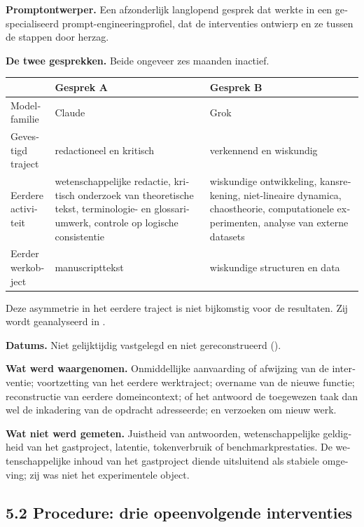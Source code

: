 \begin{dutch}
\textbf{Promptontwerper.} Een afzonderlijk langlopend gesprek dat werkte in een gespecialiseerd prompt-engineeringprofiel, dat de interventies ontwierp en ze tussen de stappen door herzag.

\textbf{De twee gesprekken.} Beide ongeveer zes maanden inactief.

\begin{center}
\small
\begin{tabularx}{\linewidth}{>{\raggedright\arraybackslash}X>{\raggedright\arraybackslash}X>{\raggedright\arraybackslash}X}
\toprule
 & \textbf{Gesprek A} & \textbf{Gesprek B} \\
\midrule
Modelfamilie & Claude & Grok \\
Gevestigd traject & redactioneel en kritisch & verkennend en wiskundig \\
Eerdere activiteit & wetenschappelijke redactie, kritisch onderzoek van theoretische tekst, terminologie- en glossariumwerk, controle op logische consistentie & wiskundige ontwikkeling, kansrekening, niet-lineaire dynamica, chaostheorie, computationele experimenten, analyse van externe datasets \\
Eerder werkobject & manuscripttekst & wiskundige structuren en data \\
\bottomrule
\end{tabularx}
\end{center}
Deze asymmetrie in het eerdere traject is niet bijkomstig voor de resultaten. Zij wordt geanalyseerd in .

\textbf{Datums.} Niet gelijktijdig vastgelegd en niet gereconstrueerd ().

\textbf{Wat werd waargenomen.} Onmiddellijke aanvaarding of afwijzing van de interventie; voortzetting van het eerdere werktraject; overname van de nieuwe functie; reconstructie van eerdere domeincontext; of het antwoord de toegewezen taak dan wel de inkadering van de opdracht adresseerde; en verzoeken om nieuw werk.

\textbf{Wat niet werd gemeten.} Juistheid van antwoorden, wetenschappelijke geldigheid van het gastproject, latentie, tokenverbruik of benchmarkprestaties. De wetenschappelijke inhoud van het gastproject diende uitsluitend als stabiele omgeving; zij was niet het experimentele object.


\subsection*{5.2 Procedure: drie opeenvolgende interventies}
\label{sec:nl:5.2}


\end{dutch}
